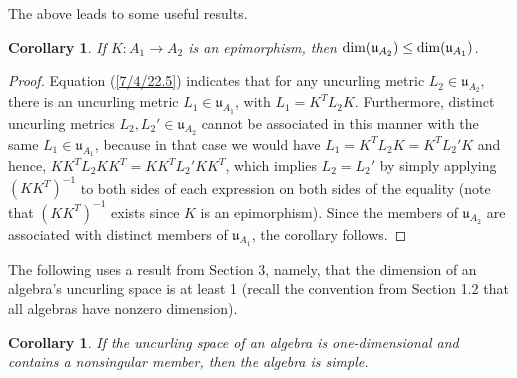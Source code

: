 \documentclass{amsart}
\numberwithin{equation}{section}
\newtheorem{corollary}[theorem]{Corollary}
\theoremstyle{definition}
\numberwithin{theorem}{section}
\begin{document}
The above leads to some useful results.  

\begin{corollary} \label{8/17/22.5} If $K:A_1\rightarrow A_2$ is an epimorphism, then ${\rm dim}(\mathfrak{u}_{A_2}) \le {\rm dim}(\mathfrak{u}_{A_1})$. \end{corollary}  

\begin{proof}   Equation (\ref{7/4/22.5}) indicates that for any uncurling metric $L_2\in \mathfrak{u}_{A_2}$, there is an uncurling metric $L_1\in \mathfrak{u}_{A_1}$, with $L_1 = K^T L_2 K$.   Furthermore, distinct uncurling metrics $L_2,L_2'\in \mathfrak{u}_{A_2}$ cannot be associated in this manner with the same $L_1\in \mathfrak{u}_{A_1}$, because in that case we would have $L_1  = K^T L_2 K = K^T L_2' K$ and hence, $KK^T L_2 KK^T = KK^T L_2' KK^T$, which implies $L_2=L_2'$ by simply applying $(KK^T)^{-1}$ to both sides of each expression on both sides of the equality (note that $(KK^T)^{-1}$ exists since $K$ is an epimorphism). Since the members of  $ \mathfrak{u}_{A_2}$ are associated with distinct members of $ \mathfrak{u}_{A_1}$, the corollary follows.   
   \end{proof}

The following uses a result from Section 3, namely, that the dimension of an algebra's uncurling space is at least 1 (recall the convention from Section 1.2 that all algebras have nonzero dimension). 

\begin{corollary}\label{8/17/22.1} If the uncurling space of an algebra is one-dimensional and contains a nonsingular member, then the algebra is simple. \end{corollary}
\end{document}
